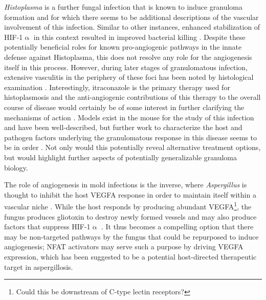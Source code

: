 \textit{Histoplasma} is a further fungal infection that is known to induce granuloma formation and for which there seems to be additional descriptions of the vascular involvement of this infection. Similar to other instances, enhanced stabilization of HIF-1$\upalpha$ in this context resulted in improved bacterial killing \citep{Friedrich2017, Friedrich2019}. Despite these potentially beneficial roles for known pro-angiogenic pathways in the innate defense against Histoplasma, this does not resolve any role for the angiogenesis itself in this process. However, during later stages of granulomatous infection, extensive vasculitis in the periphery of these foci has been noted by histological examination \citep{Mukhopadhyay2010, Kauffman2007, Mann2000}. Interestingly, itraconazole is the primary therapy used for histoplasmosis and the anti-angiogenic contributions of this therapy to the overall course of disease would certainly be of some interest in further clarifying the mechanisms of action \citep{Kauffman2007}. Models exist in the mouse for the study of this infection and have been well-described, but further work to characterize the host and pathogen factors underlying the granulomatous response in this disease seems to be in order \citep{Heninger2006}. Not only would this potentially reveal alternative treatment options, but would highlight further aspects of potentially generalizable granuloma biology.

The role of angiogenesis in mold infections is the inverse, where \textit{Aspergillus} is thought to inhibit the host VEGFA response in order to maintain itself within a vascular niche \citep{Kontoyiannis2010}. While the host responds by producing abundant VEGFA\footnote{Could this be downstream of C-type lectin receptors?}, the fungus produces gliotoxin to destroy newly formed vessels and may also produce factors that suppress HIF-1$\upalpha$ \citep{BenAmi2013}. It thus becomes a compelling option that there may be non-targeted pathways by the fungus that could be repurposed to induce angiogenesis; NFAT activators may serve such a purpose by driving VEGFA expression, which has been suggested to be a potential host-directed therapeutic target in aspergillosis.

